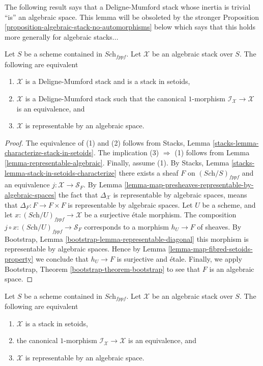 \noindent
The following result says that a Deligne-Mumford stack whose inertia
is trivial ``is'' an algebraic space. This lemma will be obsoleted by
the stronger
Proposition \ref{proposition-algebraic-stack-no-automorphisms}
below which says that this holds more generally for algebraic stacks...

\begin{lemma}
\label{lemma-algebraic-stack-no-automorphisms}
Let $S$ be a scheme contained in $\textit{Sch}_{fppf}$.
Let $\mathcal{X}$ be an algebraic stack over $S$.
The following are equivalent
\begin{enumerate}
\item $\mathcal{X}$ is a Deligne-Mumford stack and is a stack in setoids,
\item $\mathcal{X}$ is a Deligne-Mumford stack such that the
canonical $1$-morphism $\mathcal{I}_\mathcal{X} \to \mathcal{X}$
is an equivalence, and
\item $\mathcal{X}$ is representable by an algebraic space.
\end{enumerate}
\end{lemma}

\begin{proof}
The equivalence of (1) and (2) follows from
Stacks, Lemma \ref{stacks-lemma-characterize-stack-in-setoids}.
The implication (3) $\Rightarrow$ (1) follows from
Lemma \ref{lemma-representable-algebraic}.
Finally, assume (1). By
Stacks, Lemma \ref{stacks-lemma-stack-in-setoids-characterize}
there exists a sheaf $F$ on $(\textit{Sch}/S)_{fppf}$
and an equivalence $j : \mathcal{X} \to \mathcal{S}_F$. By
Lemma \ref{lemma-map-presheaves-representable-by-algebraic-spaces}
the fact that $\Delta_\mathcal{X}$ is representable by algebraic
spaces, means that $\Delta_F : F \to F \times F$
is representable by algebraic spaces.
Let $U$ be a scheme, and let $x : (\textit{Sch}/U)_{fppf} \to \mathcal{X}$
be a surjective \'etale morphism. The composition
$j \circ x : (\textit{Sch}/U)_{fppf} \to \mathcal{S}_F$
corresponds to a morphism $h_U \to F$ of sheaves. By
Bootstrap, Lemma \ref{bootstrap-lemma-representable-diagonal}
this morphism is representable by algebraic spaces.
Hence by
Lemma \ref{lemma-map-fibred-setoids-property}
we conclude that $h_U \to F$ is surjective and \'etale.
Finally, we apply
Bootstrap, Theorem \ref{bootstrap-theorem-bootstrap}
to see that $F$ is an algebraic space.
\end{proof}

\begin{proposition}
\label{proposition-algebraic-stack-no-automorphisms}
Let $S$ be a scheme contained in $\textit{Sch}_{fppf}$.
Let $\mathcal{X}$ be an algebraic stack over $S$.
The following are equivalent
\begin{enumerate}
\item $\mathcal{X}$ is a stack in setoids,
\item the canonical $1$-morphism $\mathcal{I}_\mathcal{X} \to \mathcal{X}$
is an equivalence, and
\item $\mathcal{X}$ is representable by an algebraic space.
\end{enumerate}
\end{proposition}

